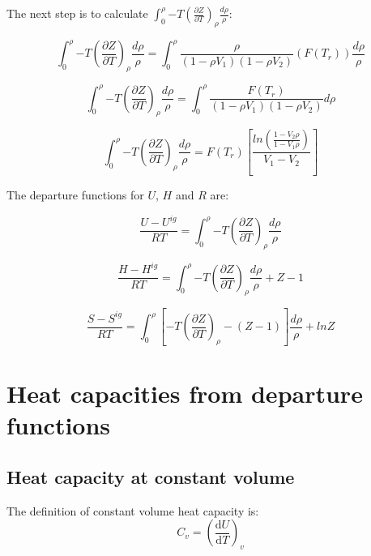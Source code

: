 \documentclass{article}
\begin{document}
The next step is to calculate $\int_0^\rho{-T\left(\frac{\partial Z}{\partial T}\right)_\rho}\frac{d\rho}{\rho}$: 

\begin{equation}
   \int_0^\rho{-T\left(\frac{\partial Z}{\partial T}\right)_\rho}\frac{d\rho}{\rho} = \int_0^\rho{\frac{\rho}{(1-\rho V_1)(1-\rho V_2)}\left(F(T_r)\right)}\frac{d\rho}{\rho}
\end{equation}

\begin{equation*}
    \int_0^\rho{-T\left(\frac{\partial Z}{\partial T}\right)_\rho}\frac{d\rho}{\rho} = \int_0^\rho{\frac{F(T_r)}{(1-\rho V_1)(1-\rho V_2)}d\rho}
\end{equation*}

\begin{equation*}
    \int_0^\rho{-T\left(\frac{\partial Z}{\partial T}\right)_\rho}\frac{d\rho}{\rho} = F(T_r)\left[\frac{ln\left(\frac{1-V_2\rho}{1-V_1\rho}\right)}{V_1-V_2} \right]
\end{equation*}

The departure functions for $U$, $H$ and $R$ are:

\begin{equation*}
    \frac{U-U^{ig}}{RT}=  \int_0^\rho{-T\left(\frac{\partial Z}{\partial T}\right)_\rho}\frac{d\rho}{\rho}
\end{equation*}

\begin{equation*}
    \frac{H-H^{ig}}{RT}=  \int_0^\rho{-T\left(\frac{\partial Z}{\partial T}\right)_\rho}\frac{d\rho}{\rho} + Z-1
\end{equation*}

\begin{equation*}
    \frac{S-S^{ig}}{RT}=  \int_0^\rho\left[{-T\left(\frac{\partial Z}{\partial T}\right)_\rho - (Z-1)}\right]\frac{d\rho}{\rho} + lnZ
\end{equation*}

\section{Heat capacities from departure functions}
\subsection{Heat capacity at constant volume }

The definition of constant volume heat capacity is:
\begin{equation}
    C_v = \left(\frac{\mathrm{d}U}{\mathrm{d}T}\right)_v
\end{equation}
\end{document}
